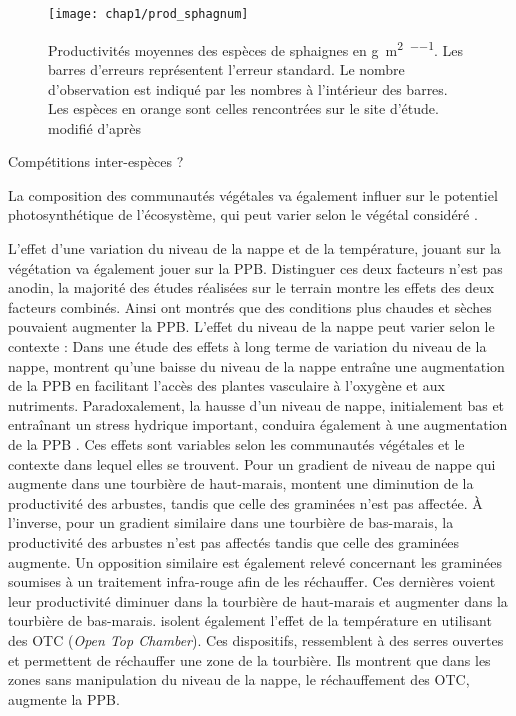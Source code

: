 \begin{figure}
\centering
\texttt{[image: chap1/prod\_sphagnum]}
\caption{Productivités moyennes des espèces de sphaignes en \si{\gram\per\square\metre\per\year}. Les barres d'erreurs représentent l'erreur standard. Le nombre d'observation est indiqué par les nombres à l'intérieur des barres. Les espèces en orange sont celles rencontrées sur le site d'étude. modifié d'après \citet{gunnarsson2005}}
\label{fig:prod_sphagnum}
\end{figure}

Compétitions inter-espèces ?


La composition des communautés végétales va également influer sur le potentiel photosynthétique de l'écosystème, qui peut varier selon le végétal considéré \citep{moore2002}.



L'effet d'une variation du niveau de la nappe et de la température, jouant sur la végétation va également jouer sur la PPB.
Distinguer ces deux facteurs n'est pas anodin, la majorité des études réalisées sur le terrain montre les effets des deux facteurs combinés.
Ainsi \citet{cai2010} ont montrés que des conditions plus chaudes et sèches pouvaient augmenter la PPB.
L'effet du niveau de la nappe peut varier selon le contexte : Dans une étude des effets à long terme de variation du niveau de la nappe, \citet{ballantyne2014} montrent qu'une baisse du niveau de la nappe entraîne une augmentation de la PPB en facilitant l'accès des plantes vasculaire à l'oxygène et aux nutriments.
Paradoxalement, la hausse d'un niveau de nappe, initialement bas et entraînant un stress hydrique important, conduira également à une augmentation de la PPB \citep{strack2013}.
Ces effets sont variables selon les communautés végétales et le contexte dans lequel elles se trouvent.
Pour un gradient de niveau de nappe qui augmente dans une tourbière de haut-marais, \citet{weltzin2000} montent une diminution de la productivité des arbustes, tandis que celle des graminées n'est pas affectée.
À l'inverse, pour un gradient similaire dans une tourbière de bas-marais, la productivité des arbustes n'est pas affectés tandis que celle des graminées augmente.
Un opposition similaire est également relevé concernant les graminées soumises à un traitement infra-rouge afin de les réchauffer.
Ces dernières voient leur productivité diminuer dans la tourbière de haut-marais et augmenter dans la tourbière de bas-marais.
\citet{munir2015} isolent également l'effet de la température en utilisant des OTC (\textit{Open Top Chamber}).
Ces dispositifs, ressemblent à des serres ouvertes et permettent de réchauffer une zone de la tourbière.
Ils montrent que dans les zones sans manipulation du niveau de la nappe, le réchauffement des OTC, augmente la PPB.

